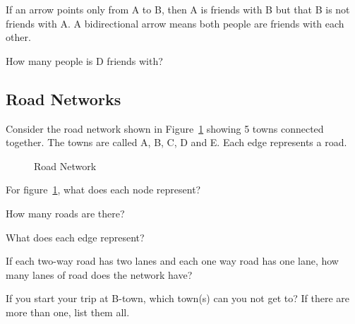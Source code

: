 \noindent
If an arrow points only from A to B, then A is friends with B but that B is not friends with A. A bidirectional arrow means both people are friends with each other.\par

\begin{alevel}
How many people is D friends with?
\end{alevel}

\subsection{Road Networks}
Consider the road network shown in Figure~\ref{F:1RN} showing 5 towns connected together. The towns are called A, B, C, D and E. Each edge represents a road.\par
\begin{figure}[H]
\begin{center}
\caption{Road Network}
\label{F:1RN}
\end{center}
\end{figure}

\begin{alevel}
For figure~\ref{F:1RN}, what does each node represent?
\end{alevel}

\begin{alevel}
How many roads are there?
\end{alevel}

\begin{alevel}
What does each edge represent?
\end{alevel}

\begin{alevel}
If each two-way road has two lanes and each one way road has one lane, how many lanes of road does the network have?
\end{alevel}

\begin{alevel}
If you start your trip at B-town, which town(s) can you not get to? If there are more than one, list them all.
\end{alevel}

